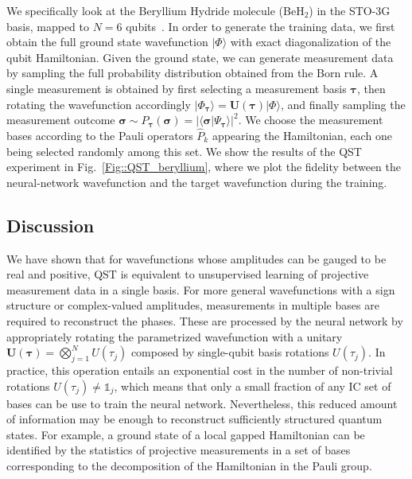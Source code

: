 \documentclass[twocolumn,english,reprint,superscriptaddress,longbibliography,pra]{revtex4-1}
\newcommand{\BeH}{BeH$_2$}
\begin{document}
We specifically look at the Beryllium Hydride molecule (\BeH) in the STO-3G basis, mapped to $N=6$ qubits~\cite{kandala_hardware-efficient_2017}. In order to generate the training data, we first obtain the full ground state wavefunction $|\Phi\rangle$ with exact diagonalization of the qubit Hamiltonian. Given the ground state, we can generate measurement data by sampling the full probability distribution obtained from the Born rule. A single measurement is obtained by first selecting a measurement basis $\bm\tau$, then rotating the wavefunction accordingly $|\Phi_{\bm\tau}\rangle=\bm{U}(\bm\tau)|\Phi\rangle$, and finally sampling the measurement outcome $\bm\sigma\sim P_{\bm\tau}(\bm{\sigma})=|\langle\bm\sigma|\Psi_{\bm\tau}\rangle|^2$. We choose the measurement bases according to the Pauli operators $\hat{P}_k$ appearing the Hamiltonian, each one being selected randomly among this set. We show the results of the QST experiment in Fig.~\ref{Fig::QST_beryllium}, where we plot the fidelity between the neural-network wavefunction and the target wavefunction during the training.



\subsection{Discussion}
We have shown that for wavefunctions whose amplitudes can be gauged to be real and positive, QST is equivalent to unsupervised learning of projective measurement data in a single basis. For more general wavefunctions with a sign structure or complex-valued amplitudes, measurements in multiple bases are required to reconstruct the phases. These are processed by the neural network by appropriately rotating the parametrized wavefunction with a unitary $\bm{U}(\bm{\tau})=\bigotimes_{j=1}^NU(\tau_j)$ composed by single-qubit basis rotations $U(\tau_j)$. In practice, this operation entails an exponential cost in the number of non-trivial rotations $U(\tau_j)\ne\mathbb{1}_j$, which means that only a small fraction of any IC set of bases can be use to train the neural network. Nevertheless, this reduced amount of information may be enough to reconstruct sufficiently structured quantum states. For example, a ground state of a local gapped Hamiltonian can be identified by the statistics of projective measurements in a set of bases corresponding to the decomposition of the Hamiltonian in the Pauli group.
\end{document}
